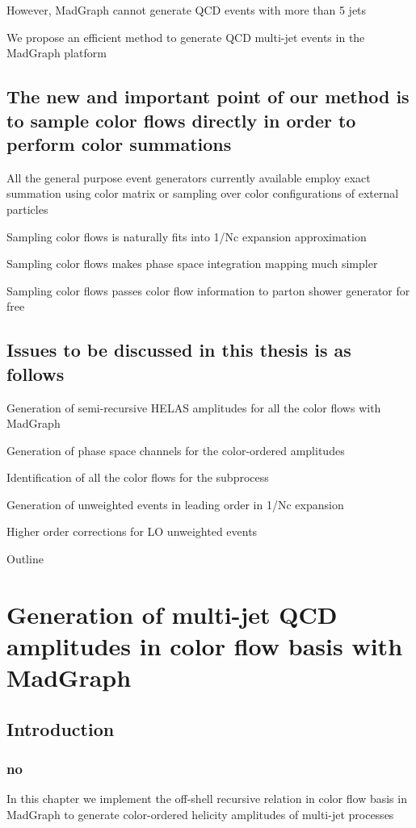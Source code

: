\documentclass{book}
\begin{document}
However, MadGraph cannot generate QCD events with more than 5 jets

We propose an efficient method to generate QCD multi-jet events in the MadGraph platform

\section{The new and important point of our method is to sample color flows directly in order to perform color summations}
All the general purpose event generators currently available employ exact summation using color matrix or sampling over color configurations of external particles

Sampling color flows is naturally fits into 1/Nc expansion approximation

Sampling color flows makes phase space integration mapping much simpler

Sampling color flows passes color flow information to parton shower generator for free

\section{Issues to be discussed in this thesis is as follows}
Generation of  semi-recursive HELAS amplitudes for all the color flows with MadGraph

Generation of  phase space channels for the color-ordered amplitudes

Identification of  all the color flows for the subprocess

Generation of  unweighted events in leading order in 1/Nc expansion

Higher order corrections for LO unweighted events 

Outline

\chapter{Generation of multi-jet QCD amplitudes in color flow basis with MadGraph}
\section{Introduction}
\subsection{no}
In this chapter we implement the off-shell recursive relation in color flow basis in MadGraph to generate color-ordered helicity amplitudes of multi-jet processes
\end{document}
